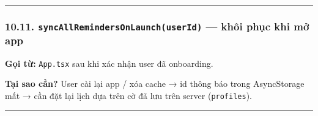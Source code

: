 \documentclass[12pt,a4paper]{article}
\newenvironment{Shaded}{%
  \VerbatimEnvironment
  \begin{quote}\small\ttfamily
}{%
  \end{quote}%
}
\begin{document}
\begin{center}\rule{0.5\linewidth}{0.5pt}\end{center}

\subsubsection{\texorpdfstring{10.11.
\texttt{syncAllRemindersOnLaunch(userId)} --- khôi phục khi mở
app}{10.11. syncAllRemindersOnLaunch(userId) --- khôi phục khi mở app}}\label{syncallremindersonlaunchuserid-khuxf4i-phux1ee5c-khi-mux1edf-app}

\textbf{Gọi từ:} \texttt{App.tsx} sau khi xác nhận user đã onboarding.

\begin{Shaded}
\begin{Highlighting}[]
   \OperatorTok{:} \NormalTok{)}\OperatorTok{:} \OperatorTok{\textless{}}\OperatorTok{\textgreater{}}\NormalTok{ \{}
  \OperatorTok{;}

   \OperatorTok{;}   

  \OperatorTok{=}  \OperatorTok{;}
  \NormalTok{) \{}
    \OperatorTok{=}  \NormalTok{()}\OperatorTok{;}
     \NormalTok{)}\OperatorTok{;}
\NormalTok{  \}}
\NormalTok{\}}
\end{Highlighting}
\end{Shaded}

\textbf{Tại sao cần?} User cài lại app / xóa cache → id thông báo trong
AsyncStorage mất → cần đặt lại lịch dựa trên cờ đã lưu trên server
(\texttt{profiles}).

\begin{center}\rule{0.5\linewidth}{0.5pt}\end{center}
\end{document}
